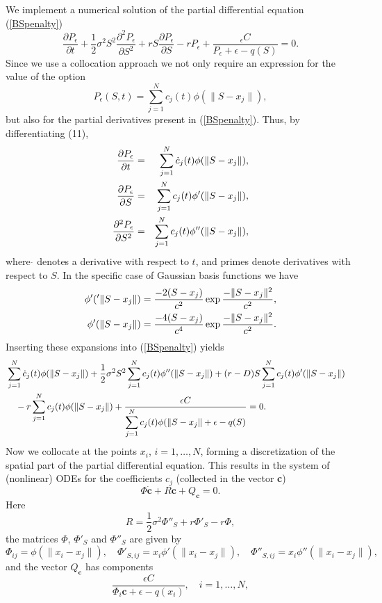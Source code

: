 \documentclass[12pt]{article}
\numberwithin{equation}{section} %
\begin{document}
We implement a numerical solution of the partial differential
equation (\ref{BSpenalty})
$$
\frac{\partial P_\epsilon}{\partial
t}+\frac{1}{2}\sigma^2S^2\frac{\partial^2 P_\epsilon}{\partial S^2}
+rS\frac{\partial P_\epsilon}{\partial
S}-rP_\epsilon+\frac{_\epsilon C }{P_\epsilon + \epsilon - q(S)}=0.
$$
Since we use a collocation approach we not only require an
expression for the value of the option
\begin{equation}\label{RBFExpansion}
P_\epsilon (S,t) = \sum_{j=1}^N c_j(t) \phi(\|S-x_j\|),
\end{equation}
but also for the partial derivatives present in (\ref{BSpenalty}).
Thus, by differentiating (11),
\begin{eqnarray*}
\frac{\partial P_\epsilon}{\partial t} & = & \sum_{j=1}^N
\dot{c}_j(t) \phi(\|S-x_j\|), \cr \frac{\partial
P_\epsilon}{\partial S} & = & \sum_{j=1}^N c_j(t) \phi'(\|S-x_j\|),
\cr \frac{\partial^{2} P_\epsilon}{\partial S^{2}} & = &
\sum_{j=1}^N c_j(t) \phi''(\|S-x_j\|),
\end{eqnarray*}
where $\dot{}$ denotes a derivative with respect to $t$, and primes
denote derivatives with respect to $S$. In the specific case of
Gaussian basis functions we have
\begin{eqnarray*}
 \phi'('\|S-x_j\|)=\frac{-2(S-x_j)}{c^2}\exp{\frac{-\|S-x_j\|^2}{c^2}},\cr
  \phi'(\|S-x_j\|)=\frac{-4(S-x_j)}{c^4}\exp{\frac{-\|S-x_j\|^2}{c^2}}.
\end{eqnarray*}
Inserting these expansions into (\ref{BSpenalty}) yields
\begin{eqnarray*}
& \displaystyle \sum_{j=1}^N \dot{c}_j(t) \phi(\|S-x_j\|) +
\frac{1}{2}\sigma^2 S^2 \sum_{j=1}^N c_j(t) \phi''(\|S-x_j\|) +
(r-D)S\sum_{j=1}^N c_j(t) \phi'(\|S-x_j\|)& \cr & \displaystyle
\quad  - r \sum_{j=1}^N c_j(t) \phi(\|S-x_j\|) + \frac{\epsilon C
}{\displaystyle \sum_{j=1}^N c_j(t) \phi(\|S-x_j\|+ \epsilon - q(S)}
= 0.&
\end{eqnarray*}
 Now we collocate at the points $x_i$,
$i=1,\ldots,N$, forming a discretization of the spatial part of the
partial differential equation. This results in the system of
(nonlinear) ODEs for the coefficients $c_j$ (collected in the vector
\textbf{c})
$$
\Phi \dot{\textbf{c}} + R \textbf{c} + Q_{\textbf{c}} = 0.
$$
Here
$$
R = \frac{1}{2} \sigma^2 \Phi''_S + r \Phi'_S - r \Phi,
$$
the matrices $\Phi$, $\Phi'_S$ and $\Phi''_S$ are given by
$$
\Phi_{ij} = \phi(\|x_i-x_j\|), \quad \Phi'_{S,ij} =
x_i\phi'(\|x_i-x_j\|), \quad \Phi''_{S,ij} = x_i\phi''(\|x_i-x_j\|),
$$
and the vector $Q_{\textbf{c}}$ has components
$$
\frac{\epsilon C }{\Phi_i \textbf{c} + \epsilon - q(x_i)}, \quad
i=1,\ldots,N,
$$
\end{document}
